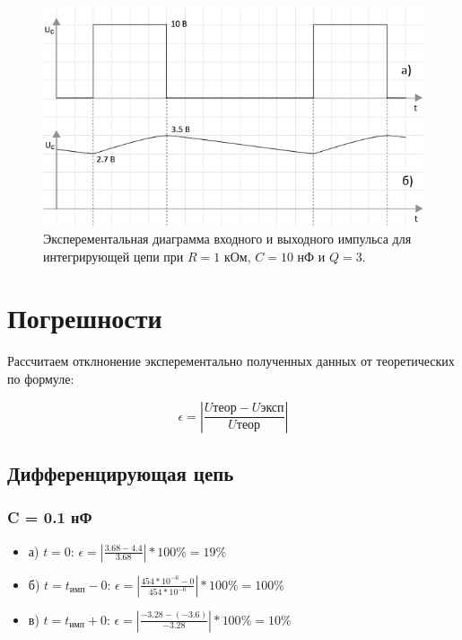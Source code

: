 \begin{figure}[H]
	\begin{center}
		\includegraphics[width=14cm]{img/q3}
		\caption{Эксперементальная диаграмма входного и выходного импульса для интегрирующей цепи при $R = 1$ кОм, $C = 10$ нФ и $Q = 3$.}
		\label{t:2} %
	\end{center}
\end{figure}

\section{Погрешности}

Рассчитаем отклнонение эксперементально полученных данных от теоретических по формуле:

\begin{equation}
		\epsilon = |\frac{U\text{теор}-U\text{эксп}}{U\text{теор}}|
\end{equation}

\subsection{Дифференцирующая цепь}
\subsubsection{C = 0.1 нФ}
\begin{itemize}
\item[] а) $t = 0$: $\epsilon = |\frac{3.68 - 4.4}{ 3.68 }| * 100\% = 19 \%$

\item[] б) $t = t_\text{имп} - 0$: $\epsilon = |\frac{454 * 10^{-6} - 0}{ 454 * 10^{-6} }| * 100\% = 100 \%$

\item[] в) $t = t_\text{имп} + 0$: $\epsilon = |\frac{-3.28 - (-3.6)}{ -3.28 }| * 100\% = 10 \%$ 
\end{itemize}

